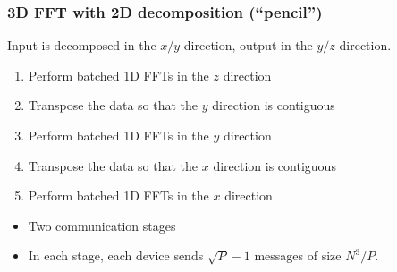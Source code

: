 \documentclass[10pt,aspectratio=169]{beamer}
\begin{document}
\begin{frame}[fragile]
  \frametitle{3D FFT with 2D decomposition (``pencil'')}
  
  Input is decomposed in the $x/y$ direction, output in the $y/z$ direction.

 
  \medskip
  
  \begin{enumerate}
  \item Perform batched 1D FFTs in the $z$ direction
  \item Transpose the data so that the $y$ direction is contiguous
  \item Perform batched 1D FFTs in the $y$ direction
  \item Transpose the data so that the $x$ direction is contiguous
  \item Perform batched 1D FFTs in the $x$ direction
  \end{enumerate}

  \medskip

  \begin{itemize}
  \item Two communication stages
  \item In each stage, each device sends $\sqrt{P}-1$ messages of size $N^3/P$.
  \end{itemize}
      
\end{frame}
\end{document}
